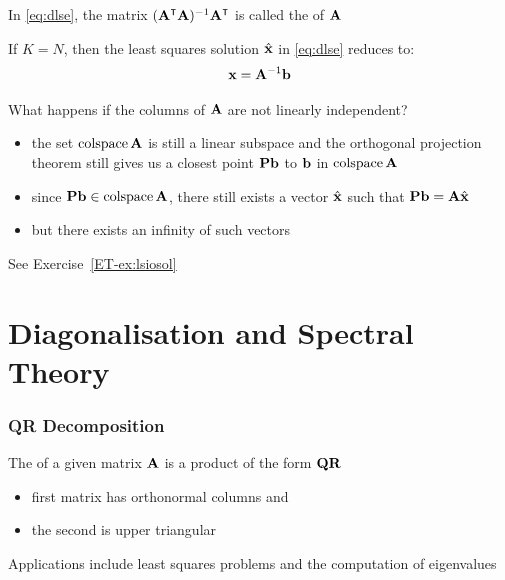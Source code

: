 \begin{frame}

    \vspace{2em}
    In  \eqref{eq:dlse}, the matrix $(\boldA^\T\boldA)^{-1} \boldA^\T$ 
    is called the  of $\mathbf A$ 
    
    \vspace{1em}
    If $K =
    N$, then the
    least squares solution $\hat {\mathbf x}$ in \eqref{eq:dlse} reduces to:
    \begin{equation*}
        {\mathbf x} = \mathbf A^{-1}{\mathbf b}
    \end{equation*}
    
\end{frame}

\begin{frame}

     \vspace{2em}
    What happens if the columns of $\mathbf A$ are not
    linearly independent? 
    
    \begin{itemize}
        \item   the set $\operatorname{colspace} \mathbf A$ is still a linear
        subspace and the orthogonal projection theorem still gives us a closest
        point $\mathbf P {\mathbf b}$ to ${\mathbf b}$ in $\operatorname{colspace} \mathbf A$
        \item   since $\mathbf P
        {\mathbf b} \in \operatorname{colspace} \mathbf A$, there still exists a vector $\hat {\mathbf x}$ such
        that $\mathbf P {\mathbf b} = \mathbf A \hat {\mathbf x}$
        \item    but there
        exists an infinity of such vectors
    \end{itemize}
    
    See Exercise~\ref{ET-ex:lsiosol}
    
\end{frame}


\section{Diagonalisation and Spectral Theory} 

\begin{frame}\frametitle{QR Decomposition}

     \vspace{2em}
    The  of a given matrix $\mathbf A$ is a product of the form $\mathbf Q \mathbf R$
    \begin{itemize}
        \item first matrix has orthonormal columns and 
        \item the second is upper triangular
    \end{itemize}
    
    \vspace{1em}
    Applications include least squares problems and the computation of eigenvalues
    
\end{frame}

